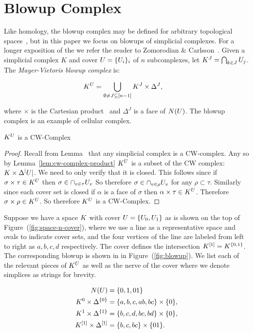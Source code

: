 \section{Blowup Complex}

Like homology, the blowup complex may be defined for arbitrary topological 
spaces~\cite{zc-lh-08}, but in this paper we focus on blowups of simplicial 
complexes. For a longer exposition of the \mvb{} we refer the reader to Zomorodian
\& Carlsson~\cite{zc-lh-08}. Given a simplicial complex $K$ and cover 
$U = \{U_i\}_i$ of $n$ subcomplexes, let 
$K^J = \bigcap_{k \in J} U_j$. The \emph{Mayer-Vietoris blowup complex} is:
\begin{linenomath*}
\begin{align*}
K^U &= \bigcup_{\emptyset \not = J \subseteq [n-1]} K^J \times \Delta^J,
\end{align*}
\end{linenomath*}
where $\times$ is the Cartesian product~\cite{zc-lh-08} and $\Delta^J$ is a face of $N(U)$. The blowup complex is an example of cellular complex. 
\begin{lemma}
$K^U$ is a CW-Complex
\end{lemma}
\begin{proof}
Recall from Lemma~\cite{lem:simp-is-cw} that any simplicial complex is a CW-complex. Any so by Lemma~\ref{lem:cw-complex-product} $K^U$ is a subset of the CW complex: $K \times \Delta^|U|$. We need to only verify that it is closed. This follows since if $\sigma \times \tau \in K^U$ then $\sigma \in \cap_{v \in \tau} U_{v}$ So therefore $\sigma \in \cap_{v \in \rho} U_v$ for any $\rho \subset \tau$. Similarly since each cover set is closed if $\alpha$ is a face of $\sigma$ then $\alpha \times \tau \in K^U$.  Therefore $\sigma \times \rho \in K^U$. So therefore $K^U$ is a CW-Complex.
\end{proof}
\begin{example}
\label{ex:blowup}
Suppose we have a space $K$ with cover $U = \{ U_0, U_1 \}$ as is shown on 
the top of Figure~(\ref{fig:space-n-cover}), where we use a line as a 
representative space and ovals to indicate cover sets, and the four vertices
of the line are labeled from left to right as $a, b, c, d$ respectively.
The cover defines the intersection $K^{[1]} = K^{ \{ 0 , 1 \} }$. 
The corresponding blowup is shown in in Figure~(\ref{fig:blowup}). We list each of
the relevant pieces of $K^{U}$ as well as the nerve of the cover where we denote simplices as strings for 
brevity.  
\begin{linenomath*}
\begin{align*}
N(U) &= \{ 0, 1, 01 \} \\
K^0 \times \Delta^{\{0\}} &= \{a,b,c,ab,bc\} \times \{0\}, \\
K^1 \times \Delta^{\{1\}} &= \{b,c,d,bc,bd\} \times \{0\}, \\
K^{[1]} \times \Delta^{[1]} &=\{b,c,bc\} \times \{01\}. 
\end{align*}
\end{linenomath*}
\end{example}
